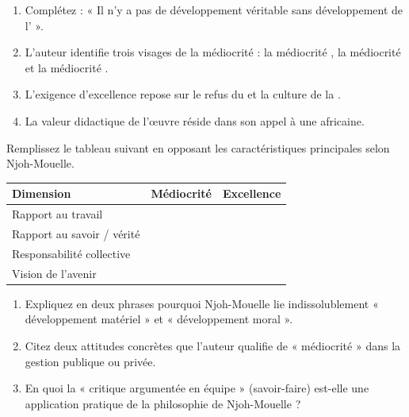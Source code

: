 \documentclass[11pt]{article}
\begin{document}
\begin{exercice}
\begin{enumerate}
    \item Complétez : « Il n'y a pas de développement véritable sans développement de l'\underline{\hspace{4cm}} ».
    \item L'auteur identifie trois visages de la médiocrité : la médiocrité \underline{\hspace{3cm}}, la médiocrité \underline{\hspace{3cm}} et la médiocrité \underline{\hspace{3cm}}.
    \item L'exigence d'excellence repose sur le refus du \underline{\hspace{3cm}} et la culture de la \underline{\hspace{3cm}}.
    \item La valeur didactique de l'œuvre réside dans son appel à une \underline{\hspace{3cm}} africaine.
\end{enumerate}
\end{exercice}

\begin{exercice}
Remplissez le tableau suivant en opposant les caractéristiques principales selon Njoh-Mouelle.

\begin{tabular}{|p{4cm}|p{5.5cm}|p{5.5cm}|}
\hline
\textbf{Dimension} & \textbf{Médiocrité} & \textbf{Excellence} \\ \hline
Rapport au travail & & \\ \hline
Rapport au savoir / vérité & & \\ \hline
Responsabilité collective & & \\ \hline
Vision de l'avenir & & \\ \hline
\end{tabular}
\end{exercice}

\begin{exercice}
\begin{enumerate}
    \item Expliquez en deux phrases pourquoi Njoh-Mouelle lie indissolublement « développement matériel » et « développement moral ».
    \item Citez deux attitudes concrètes que l'auteur qualifie de « médiocrité » dans la gestion publique ou privée.
    \item En quoi la « critique argumentée en équipe » (savoir-faire) est-elle une application pratique de la philosophie de Njoh-Mouelle ?
\end{enumerate}
\end{exercice}
\end{document}
